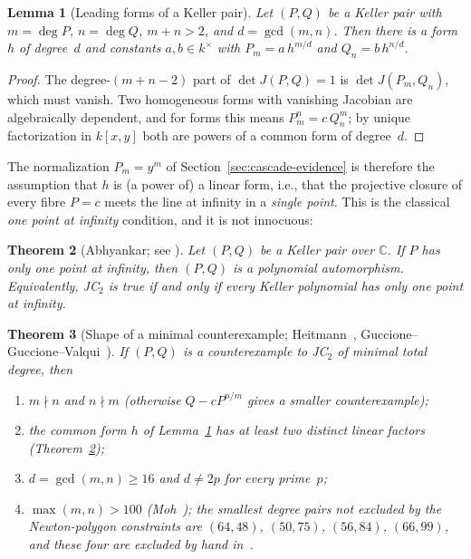 \documentclass[12pt,a4paper]{article}
\newtheorem{theorem}{Theorem}[section]
\newtheorem{lemma}[theorem]{Lemma}
\theoremstyle{definition}
\newcommand{\CC}{\mathbb{C}}
\newcommand{\kk}{k}
\begin{document}
\begin{lemma}[Leading forms of a Keller pair]\label{lem:leading-forms}
Let $(P,Q)$ be a Keller pair with $m = \deg P$, $n = \deg Q$,
$m + n > 2$, and $d = \gcd(m,n)$. Then there is a form $h$ of degree~$d$
and constants $a, b \in \kk^\times$ with
$P_m = a\,h^{m/d}$ and $Q_n = b\,h^{n/d}$.
\end{lemma}

\begin{proof}
The degree-$(m+n-2)$ part of $\det J(P,Q) = 1$ is $\det J(P_m, Q_n)$,
which must vanish. Two homogeneous forms with vanishing Jacobian are
algebraically dependent, and for forms this means $P_m^{n} = c\,Q_n^{m}$;
by unique factorization in $\kk[x,y]$ both are powers of a common form
of degree~$d$.
\end{proof}

The normalization $P_m = y^m$ of Section~\ref{sec:cascade-evidence} is
therefore the assumption that $h$ is (a power of) a linear form, i.e.,
that the projective closure of every fibre $P = c$ meets the line at
infinity in a \emph{single point}. This is the classical
\emph{one point at infinity} condition, and it is not innocuous:

\begin{theorem}[Abhyankar; see \cite{Abhyankar1977, vdEssen}]%
\label{thm:abhyankar-one-point}
Let $(P,Q)$ be a Keller pair over $\CC$. If $P$ has only one point at
infinity, then $(P,Q)$ is a polynomial automorphism.
Equivalently, JC$_2$ is true if and only if every Keller polynomial has
only one point at infinity.
\end{theorem}

\begin{theorem}[Shape of a minimal counterexample;
Heitmann~\cite{Heitmann1990}, Guccione--Guccione--Valqui~\cite{GGV,GGV2014}]%
\label{thm:min-counterexample}
If $(P,Q)$ is a counterexample to JC$_2$ of minimal total degree, then
\begin{enumerate}
\item[\textup{(a)}] $m \nmid n$ and $n \nmid m$
  \textup{(}otherwise $Q - cP^{n/m}$ gives a smaller counterexample\textup{)};
\item[\textup{(b)}] the common form $h$ of Lemma~\ref{lem:leading-forms}
  has at least two distinct linear factors
  \textup{(}Theorem~\ref{thm:abhyankar-one-point}\textup{)};
\item[\textup{(c)}] $d = \gcd(m,n) \geq 16$ and $d \neq 2p$ for every
  prime~$p$;
\item[\textup{(d)}] $\max(m,n) > 100$ \textup{(Moh~\cite{Moh})}; the
  smallest degree pairs not excluded by the Newton-polygon constraints
  are $(64,48)$, $(50,75)$, $(56,84)$, $(66,99)$, and these four are
  excluded by hand in~\cite{GGV2014}.
\end{enumerate}
\end{theorem}
\end{document}
